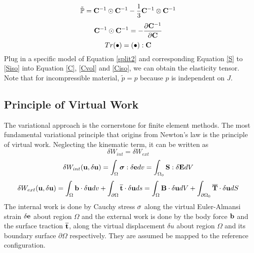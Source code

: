 \begin{equation}
\tilde{\mathbb{P}} = \bold{C}^{-1} \odot \bold{C}^{-1} -  \frac{1}{3}\bold{C}^{-1} \otimes \bold{C}^{-1} 
\end{equation}
\begin{equation}
\bold{C}^{-1}\odot\bold{C}^{-1} = - \frac{\partial{\bold{C}^{-1}}}{\partial{\bold{C}}}
\end{equation}
\begin{equation}
Tr(\bullet) = (\bullet) : \bold{C}
\end{equation}
Plug in a specific model of Equation \ref{split2} and corresponding Equation \ref{S} to \ref{Siso} into Equation \ref{C}, \ref{Cvol} and \ref{Ciso}, we can obtain the elasticity tensor. Note that for incompressible material, $\tilde{p} = p$ because $p$ is independent on $J$.

%
\subsection{Principle of Virtual Work} \label{PVW}
The variational approach is the cornerstone for finite element methods. The most fundamental variational principle that origins from Newton's law is the principle of virtual work. Neglecting the kinematic term, it can be written as
\begin{equation} \label{basic}
\delta{W_{int}} = \delta{W_{ext}}
\end{equation}
\begin{equation} \label{Wint}
\delta W_{int}(\bold{u}, \delta\bold{u}) = \int_\Omega \boldsymbol\sigma : \delta\bold{e}dv = \int_{\Omega_{0}}\bold{S} : \delta\bold{E}dV
\end{equation}
\begin{equation} \label{Wext}
\delta W_{ext}(\bold{u}, \delta\bold{u}) = \int_\Omega\bold{b}\cdot\delta\bold{u}dv +  \int_{\partial\Omega}\overline{\bold{t}}\cdot\delta{\bold{u}}ds = \int_\Omega\bold{B}\cdot\delta\bold{u}dV +  \int_{\partial{\Omega_0}}\overline{\bold{T}}\cdot\delta{\bold{u}}dS
\end{equation}
The internal work is done by Cauchy stress $\bold\sigma$ along the virtual Euler-Almansi strain $\delta\bold{e}$ about region $\Omega$ and the external work is done by the body force $\bold{b}$ and the surface traction $\overline{\bold{t}}$, along the virtual displacement $\delta{u}$ about region $\Omega$ and its boundary surface $\partial\Omega$ respectively. They are assumed be mapped to the reference configuration. 

